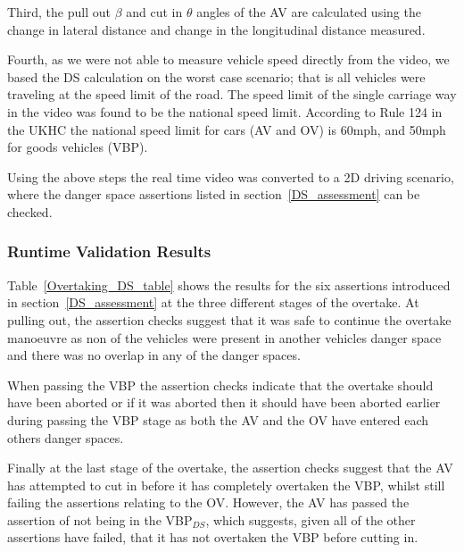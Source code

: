 Third, the pull out $\beta$ and cut in $\theta$ angles of the AV are calculated using the change in lateral distance and change in the longitudinal distance measured.  

Fourth, as we were not able to measure vehicle speed directly from the video, we based the DS calculation on the worst case scenario; that is all vehicles were traveling at the speed limit of the road. 
%
The speed limit of the single carriage way in the video was found to be the national speed limit. 
%
According to Rule 124 in the UKHC the national speed limit for cars (AV and OV) is 60mph, and 50mph for goods vehicles (VBP).

Using the above steps the real time video was converted to a 2D driving scenario, where the danger space assertions listed in section~\ref{DS_assessment} can be checked.

\subsubsection{Runtime Validation Results}
Table~\ref{Overtaking_DS_table} shows the results for the six assertions introduced in section~\ref{DS_assessment} at the three different stages of the overtake.
%
At pulling out, the assertion checks suggest that it was safe to continue the overtake manoeuvre as non of the vehicles were present in another vehicles danger space and there was no overlap in any of the danger spaces.

When passing the VBP the assertion checks indicate that the overtake should have been aborted or if it was aborted then it should have been aborted earlier during passing the VBP stage as both the AV and the OV have entered each others danger spaces.

Finally at the last stage of the overtake, the assertion checks suggest that the AV has attempted to cut in before it has completely overtaken the VBP, whilst still failing the assertions relating to the OV. 
%
However, the AV has passed the assertion of not being in the VBP$_{DS}$, which suggests, given all of the other assertions have failed, that it has not overtaken the VBP before cutting in.

